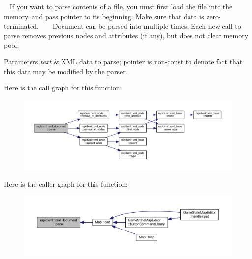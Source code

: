 ~\newline
 If you want to parse contents of a file, you must first load the file into the memory, and pass pointer to its beginning. Make sure that data is zero-\/terminated. ~\newline
~\newline
 Document can be parsed into multiple times. Each new call to parse removes previous nodes and attributes (if any), but does not clear memory pool. 
\begin{DoxyParams}{Parameters}
{\em text} & X\+M\+L data to parse; pointer is non-\/const to denote fact that this data may be modified by the parser. \\
\hline
\end{DoxyParams}


Here is the call graph for this function\+:\nopagebreak
\begin{figure}[H]
\begin{center}
\leavevmode
\includegraphics[width=350pt]{singletonrapidxml_1_1xml__document_ac6e73ff9ac323bf5a370c38feb03a6b1_cgraph}
\end{center}
\end{figure}




Here is the caller graph for this function\+:\nopagebreak
\begin{figure}[H]
\begin{center}
\leavevmode
\includegraphics[width=350pt]{singletonrapidxml_1_1xml__document_ac6e73ff9ac323bf5a370c38feb03a6b1_icgraph}
\end{center}
\end{figure}


